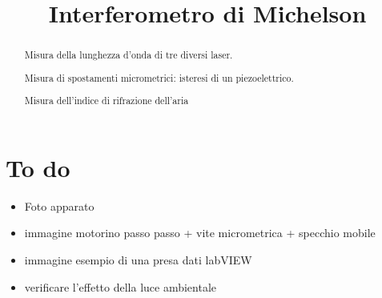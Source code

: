 \documentclass[a4paper]{article}
\begin{document}
	\title{Interferometro di Michelson}
	\maketitle
	
	\section*{To do}
	\begin{itemize}
		\item Foto apparato
		\item immagine motorino passo passo + vite micrometrica + specchio mobile
		\item immagine esempio di una presa dati labVIEW
		\item verificare l'effetto della luce ambientale
	\end{itemize}
	
	
	\begin{abstract}
		 Misura della lunghezza d'onda di tre diversi laser.
		 
		 Misura di spostamenti micrometrici: isteresi di un piezoelettrico.
		 
		 Misura dell'indice di rifrazione dell'aria
	\end{abstract}
\end{document}
